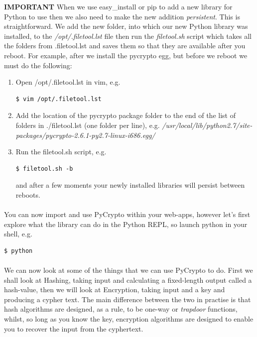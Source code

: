 \documentclass[12pt, a4paper, twoside]{book}
\begin{document}
\begin{framed}
{\textbf{IMPORTANT} When we use easy\_install or pip to add a new library for Python to use then we also need to make the new addition \emph{persistent}. This is straightforward. We add the new folder, into which our new Python library was installed, to the \emph{/opt/.filetool.lst} file then run the \emph{filetool.sh} script which takes all the folders from .filetool.lst and saves them so that they are available after you reboot. For example, after we install the pycrypto egg, but before we reboot we must do the following:
\begin{enumerate}
\item Open /opt/.filetool.lst in vim, e.g. 
\begin{lstlisting}[style=DOS]
    $ vim /opt/.filetool.lst
\end{lstlisting}
\item Add the location of the pycrypto package folder to the end of the list of folders in ./filetool.lst (one folder per line), e.g. \emph{/usr/local/lib/python2.7/site-packages/pycrypto-2.6.1-py2.7-linux-i686.egg/}
\item Run the filetool.sh script, e.g.
\begin{lstlisting}[style=DOS]
    $ filetool.sh -b
\end{lstlisting}
    and after a few moments your newly installed libraries will persist between reboots.
\end{enumerate}

}
\end{framed}


\paragraph{} You can now import and use PyCrypto within your web-apps, however let's first explore what the library can do in the Python REPL, so launch python in your shell, e.g.

\begin{lstlisting}[style=DOS]
    $ python
\end{lstlisting}

\paragraph{} We can now look at some of the things that we can use PyCrypto to do. First we shall look at Hashing, taking input and calculating a fixed-length output called a hash-value, then we will look at Encryption, taking input and a key and producing a cypher text. The main difference between the two in practise is that hash algorithms are designed, as a rule, to be one-way or \emph{trapdoor} functions, whilst, so long as you know the key, encryption algorithms are designed to enable you to recover the input from the cyphertext.
\end{document}
